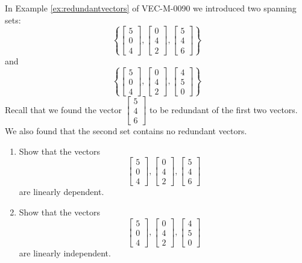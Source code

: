 \documentclass{ximera}
\begin{document}
\begin{example}\label{ex:linearlydependentindependent}
In Example \ref{ex:redundantvectors} of VEC-M-0090 we introduced two spanning sets:
$$\left\{\begin{bmatrix}5\\0\\4\end{bmatrix}, \begin{bmatrix}0\\4\\2\end{bmatrix},\begin{bmatrix}5\\4\\6\end{bmatrix}\right\}$$
and
$$\left\{\begin{bmatrix}5\\0\\4\end{bmatrix}, \begin{bmatrix}0\\4\\2\end{bmatrix},\begin{bmatrix}4\\5\\0\end{bmatrix}\right\}$$
Recall that we found the vector $\begin{bmatrix}5\\4\\6\end{bmatrix}$ to be redundant of the first two vectors. We also found that the second set contains no redundant vectors. 

\begin{enumerate}
\item\label{item:linearlydependent}
Show that the vectors
$$\begin{bmatrix}5\\0\\4\end{bmatrix}, \begin{bmatrix}0\\4\\2\end{bmatrix},\begin{bmatrix}5\\4\\6\end{bmatrix}$$
are linearly dependent.
\item\label{item:linearlyindependent}
Show that the vectors
$$\begin{bmatrix}5\\0\\4\end{bmatrix}, \begin{bmatrix}0\\4\\2\end{bmatrix},\begin{bmatrix}4\\5\\0\end{bmatrix}$$ are linearly independent.
\end{enumerate}


\end{example}
\end{document}
